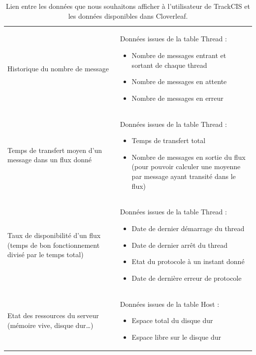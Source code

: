 			\begin{table}[H]
				\centering
				\caption{\label{donnees_threads} Lien entre les données que nous
				souhaitons afficher à l'utilisateur de TrackCIS et les données disponibles
				dans Cloverleaf.}
				\begin{tabular}{| p{5cm} | p{8cm} |}
					\hline
						\thead{Type de statistique}
						&\thead{Données dans la table Thread}
						\\
					\hline
						Historique du nombre de message
						&
						Données issues de la table Thread :
						\begin{itemize}
						  \item Nombre de messages entrant et sortant de chaque thread
						  \item Nombre de messages en attente
						  \item Nombre de messages en erreur
						\end{itemize}
						\\
					\hline
						Temps de transfert moyen d'un message dans un flux donné
						&
						Données issues de la table Thread :
						\begin{itemize}
						  \item Temps de transfert total
						  \item Nombre de messages en sortie du flux (pour pouvoir calculer une
						  moyenne par message ayant transité dans le flux)
						\end{itemize}
						\\
					\hline
						Taux de disponibilité d'un flux (temps de bon fonctionnement divisé par le
						temps total)
						&
						Données issues de la table Thread :
						\begin{itemize}
						  \item Date de dernier démarrage du thread
						  \item Date de dernier arrêt du thread
						  \item Etat du protocole à un instant donné
						  \item Date de dernière erreur de protocole
						\end{itemize}
						\\
					\hline
						Etat des ressources du serveur (mémoire vive, disque dur\ldots)
						&
						Données issues de la table Host :
						\begin{itemize}
						  \item Espace total du disque dur
						  \item Espace libre sur le disque dur

\end{itemize}
\end{tabular}
\end{table}
